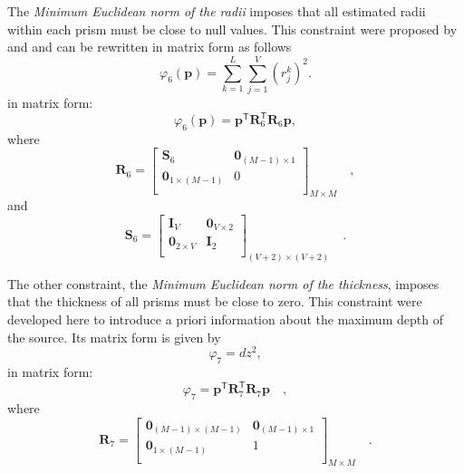 The \textit{Minimum Euclidean norm of the radii} imposes that 
all estimated radii within each prism must be close to null values. This constraint were proposed by \cite{oliveirajr-etal2011} and \cite{oliveirajr-barbosa2013} and can be rewritten in matrix form as follows
\begin{equation}\label{eq:phi6_sum}
\varphi_{6}(\textbf{p}) = \sum\limits^{L}_{k=1}\sum\limits^{V}_{j=1}\left(r_{j}^{k}\right)^2 .
\end{equation}
in matrix form:
\begin{equation}\label{eq:phi6}
\varphi_{6}(\mathbf{p}) = \mathbf{p}^{\mathsf{T}} \mathbf{R}_{6}^{\mathsf{T}} \mathbf{R}_{6} \mathbf{p},
\end{equation}
where
\begin{equation}
\mathbf{R}_{6} = 
\begin{bmatrix}
\mathbf{S}_{6} & \mathbf{0}_{(M-1) \times 1} \\
\mathbf{0}_{1 \times (M-1)} & 0 \\
\end{bmatrix}_{M\times M} \quad ,
\label{eq:R6-matrix}
\end{equation}
and 
\begin{equation}
\mathbf{S}_{6} = 
\begin{bmatrix}
\mathbf{I}_{V} & \mathbf{0}_{V \times 2} \\
\mathbf{0}_{2 \times V} & \mathbf{I}_{2} \\
\end{bmatrix}_{ (V+2)\times (V+2)} \quad .
\label{eq:S6-matrix}
\end{equation}

The other constraint, the \textit{Minimum Euclidean norm of the thickness}, imposes that the thickness of all prisms must be close to zero. This constraint were developed here to introduce a priori information about the maximum depth of the source. Its matrix form 
is given by
\begin{equation}\label{eq:phi7_sum}
\varphi_7 = dz^2 ,
\end{equation}
in matrix form:
\begin{equation}
\varphi_7 = \mathbf{p}^{\mathsf{T}} \mathbf{R}_{7}^{\mathsf{T}} \mathbf{R}_{7} \mathbf{p} \quad ,
\label{eq:phi7}
\end{equation}
where
\begin{equation}
\mathbf{R}_{7} =
\begin{bmatrix}
\mathbf{0}_{(M-1) \times (M-1)} & \mathbf{0}_{(M-1) \times 1} \\
\mathbf{0}_{1 \times (M-1)} & 1 \\
\end{bmatrix}_{ M \times M } \quad .
\end{equation}

